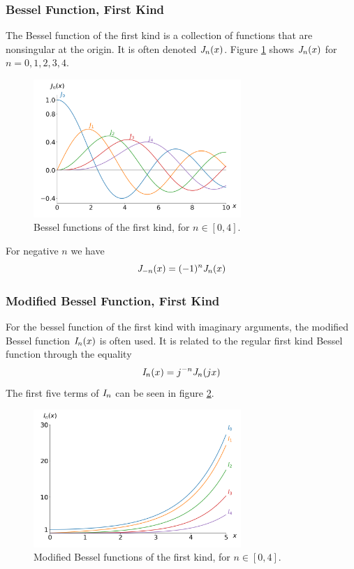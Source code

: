 \subsubsection{Bessel Function, First Kind}

The Bessel function of the first kind is a collection of functions that are nonsingular
at the origin. It is often denoted $\mathit{J}_{n}(x)$. Figure \ref*{fig:Jnplot} shows
$\mathit{J}_{n}(x)$ for $n=0,1,2,3,4$.\cite{weisstein_bessel_first_kind}

\begin{figure}[h]
    \centering
    \includegraphics[width=0.7\textwidth]{figs/Jnplot.png}
    \caption{Bessel functions of the first kind, for $n\in[0,4]$.}
    \label{fig:Jnplot}
\end{figure}

For negative $n$ we have
\begin{equation}
    \mathit{J}_{-n}(x) = (-1)^n \mathit{J}_{n}(x)
\end{equation}

\subsubsection{Modified Bessel Function, First Kind}
For the bessel function of the first kind with imaginary
arguments, the modified Bessel function $\mathit{I}_{n}(x)$ is often used.
It is related to the regular first kind Bessel function
through the equality
\begin{equation}
    \mathit{I}_{n}(x) = j^{-n}\mathit{J}_{n}(jx)
\end{equation}
\cite{weisstein_modified}
The first five terms of $\mathit{I}_{n}$ can be seen in figure \ref*{fig:Inplot}.

\begin{figure}[h]
    \centering
    \includegraphics[width=0.7\textwidth]{figs/Inplot.png}
    \caption{Modified Bessel functions of the first kind, for $n\in[0,4]$.}
    \label{fig:Inplot}
\end{figure}

